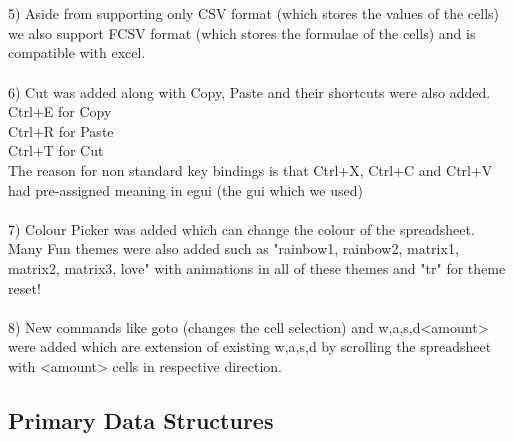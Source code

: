 \documentclass{article}
\begin{document}
\\
\\
5) Aside from supporting only CSV format (which stores the values of the cells) we also support FCSV format (which stores the formulae of the cells) and is compatible with excel.
\\ \\
6) Cut was added along with Copy, Paste and their shortcuts were also added. \\
Ctrl+E for Copy\\
Ctrl+R for Paste\\
Ctrl+T for Cut\\
The reason for non standard key bindings is that Ctrl+X, Ctrl+C and Ctrl+V had pre-assigned meaning in egui (the gui which we used)
\\ \\
7) Colour Picker was added which can change the colour of the spreadsheet. Many Fun themes were also added such as "rainbow1, rainbow2, matrix1, matrix2, matrix3, love" with animations in all of these themes and "tr" for theme reset!
\\
\\
8) New commands like goto (changes the cell selection) and w,a,s,d<amount> were added which are extension of existing w,a,s,d by scrolling the spreadsheet with <amount> cells in respective direction.
\subsection{Primary Data Structures}
\label{sec:data_structures}
\end{document}
